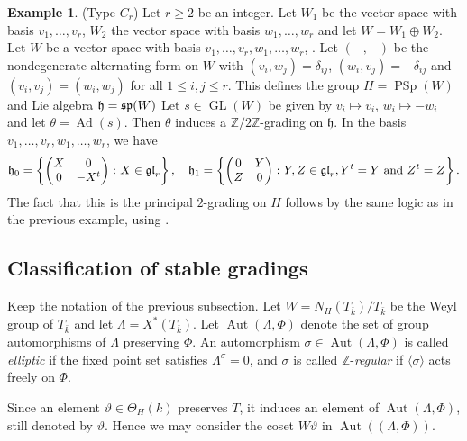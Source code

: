 \documentclass{article} %
\numberwithin{equation}{section}
\theoremstyle{definition}
\newtheorem{example}[proposition]{Example}
\DeclareMathOperator{\GL}{GL}
\DeclareMathOperator{\PSp}{PSp}
\DeclareMathOperator{\Ad}{Ad}
\DeclareMathOperator{\Aut}{Aut}
\newcommand{\Z}{\mathbb{Z}}
\newcommand{\frakh}{\mathfrak h}
\newcommand{\bZ}{\mathbb Z}
\newcommand{\ra}{\rangle}
\newcommand{\rl}{r} %
\begin{document}
\begin{example}\label{ex-Cn-2grading} (Type $C_{\rl}$)
Let $\rl\geq2$ be an integer.
Let $W_1$ be the vector space with basis $v_1, \dots, v_\rl$, $W_2$ the vector space with basis $w_1, \dots, w_\rl$ and let $W = W_1 \oplus W_2$.
Let $W$ be a vector space with basis $v_1, \dots, v_\rl, w_1, \dots, w_\rl$, .
Let $(-,-)$ be the nondegenerate alternating form on $W$ with $(v_i,w_j) = \delta_{ij}$, $(w_i, v_j) = -\delta_{ij}$ and $(v_i, v_j) = (w_i, w_j)$ for all $1\leq i,j\leq \rl$.
This defines the group $H = \PSp(W)$ and Lie algebra $\frak{h} = \mathfrak{sp}(W)$
Let $s\in \GL(W)$ be given by $v_i\mapsto v_i$, $w_i \mapsto -w_i$ and let $\theta = \Ad(s)$. 
Then $\theta$ induces a $\Z/2\Z$-grading on $\frakh$.
In the basis $v_1, \dots, v_\rl, w_1, \dots, w_\rl$, we have
\[
\frakh_0 = 
\left\{
\begin{pmatrix}
    X & 0 \\ 0 & -X^t 
\end{pmatrix}
\colon X \in \frak{gl}_\rl
\right\}
, \quad 
\frakh_1 = \left\{
\begin{pmatrix}
    0 & Y \\ Z & 0 
\end{pmatrix}
\colon Y,Z \in \frak{gl}_\rl, Y^t = Y \text{ and }Z^t = Z
\right\}.
\]
The fact that this is the principal $2$-grading on $H$ follows by the same logic as in the previous example, using \cite[p. 305, Proposition 2, Case (CI)]{Ohta-classificationadmissiblenilpotent}.
\end{example}

\subsection{Classification of stable gradings}

Keep the notation of the previous subsection.
Let $W = N_H(T_{\bar{k}})/T_{\bar{k}}$ be the Weyl group of $T_{\bar{k}}$ and let $\Lambda = X^*(T_{\bar{k}})$.
Let $\Aut(\Lambda, \Phi)$ denote the set of group automorphisms of $\Lambda$ preserving $\Phi$. 
An automorphism $\sigma  \in \Aut(\Lambda, \Phi)$ is called \textit{elliptic} if the fixed point set satisfies $\Lambda^\sigma = 0$,
and $\sigma$ is called $\bZ$-\textit{regular} if $\langle \sigma \ra$ acts freely on $\Phi$. 


Since an element $\vartheta\in \Theta_H(k)$ preserves $T$, it induces an element of $\Aut(\Lambda, \Phi)$, still denoted by $\vartheta$. 
Hence we may consider the coset $W\vartheta$ in $\Aut((\Lambda, \Phi))$.
\end{document}
